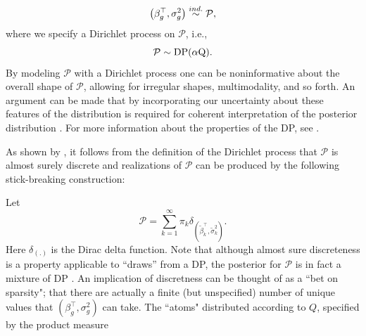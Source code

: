 \begin{equation*}
\left(\beta_g^\top,\sigma^2_g\right) \stackrel{ind.}{\sim} \mathcal{P},
\end{equation*}
where we specify a Dirichlet process on $\mathcal{P}$, i.e.,
\begin{equation*}
\mathcal{P} \sim \operatorname{DP}(\alpha \mbox{Q}).
\end{equation*}
\iftoggle{thesis}{
The use of this prior, due to \citet{ferguson}, is a distribution over probability distributions, such that for any finite disjoint partition $\{A_i\}_{i>=1}^n$ on $\mathbb{R}^p$, $\mathcal{P}$ is a random measure such that the joint distribution $\left(\mathcal{P}(A_1),\ldots,\mathcal{P}(A_n)\right) \sim \op{Dir}\left(\alpha Q(A_1),\ldots,\alpha Q(A_n)\right).$ The Dirichlet process has two parameters: $Q$, the base measure, represents a prior guess at the distribution. $\alpha$, the concentration parameter expresses the degree to which $\mathcal{P}$ will agree with $Q$ on any set $A$. This follows from the definition given above and known properties of the Dirichlet distribution, i.e., $\op{E}\left(\mathcal{P}(A)\right)=Q(A)$, and $\op{V}\left(\mathcal{P}(A)\right)=\frac{Q(A)(1 - Q(A)}{\alpha + 1}$, showing that $\mathcal{P}(A) \stackrel{p}{\rightarrow} Q(A)$ as $\alpha \rightarrow \infty$ for any set $A$.
}{}
By modeling $\mathcal{P}$ with a Dirichlet process one can be noninformative about the overall shape of $\mathcal{P}$, allowing for irregular shapes, multimodality, and so forth. An argument can be made that by incorporating our uncertainty about these features of the distribution is required for coherent interpretation of the posterior distribution \citep{walker2010bayesian}. For more information about the properties of the DP, see \cite{ferguson}.

As shown by \citet{sethuraman}, it follows from the definition of the Dirichlet process that $\mathcal{P}$ is almost surely discrete and realizations of $\mathcal{P}$ can be produced by the following stick-breaking construction:

Let 
\begin{equation}
\mathcal{P} =\sum_{k=1}^\infty \pi_k \delta_{\left(\tilde{\beta}_k^\top ,\tilde{\sigma}^2_k\right)}.
\end{equation}
Here $\delta_{(.)}$ is the Dirac delta function. Note that although almost sure discreteness is a property applicable to ``draws'' from a DP, the posterior for $\mathcal{P}$ is in fact a mixture of DP \citep{antoniak}. An implication of discretness can be thought of as a ``bet on sparsity"; that there are actually a finite (but unspecified) number of unique values that $(\beta_g^\top,\sigma^2_g)$ can take.  
 The ``atoms" distributed according to $Q$, specified by the product measure

